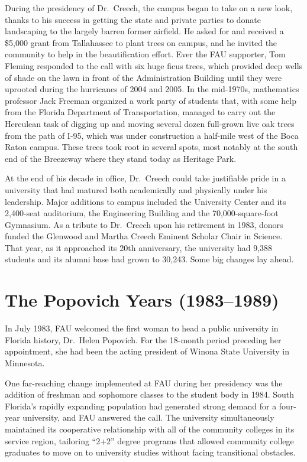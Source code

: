 \documentclass{article}
\begin{document}
During the presidency of Dr.\ Creech, the campus began to take on a new look, thanks to his success in getting the state and private parties to donate landscaping to the largely barren former airfield.  He asked for and received a \$5,000 grant from Tallahassee to plant trees on campus, and he invited the community to help in the beautification effort.  Ever the FAU supporter, Tom Fleming responded to the call with six huge ficus trees, which provided deep wells of shade on the lawn in front of the Administration Building until they were uprooted during the hurricanes of 2004 and 2005.  In the mid-1970s, mathematics professor Jack Freeman organized a work party of students that, with some help from the Florida Department of Transportation, managed to carry out the Herculean task of digging up and moving several dozen full-grown live oak trees from the path of I-95, which was under construction a half-mile west of the Boca Raton campus.  These trees took root in several spots, most notably at the south end of the Breezeway where they stand today as Heritage Park.

At the end of his decade in office, Dr.\ Creech could take justifiable pride in a university that had matured both academically and physically under his leadership.  Major additions to campus included the University Center and its 2,400-seat auditorium, the Engineering Building and the 70,000-square-foot Gymnasium.  As a tribute to Dr.\ Creech upon his retirement in 1983, donors funded the Glenwood and Martha Creech Eminent Scholar Chair in Science.  That year, as it approached its 20th anniversary, the university had 9,388 students and its alumni base had grown to 30,243.  Some big changes lay ahead.

\section{The Popovich Years (1983--1989)}

In July 1983, FAU welcomed the first woman to head a public university in Florida history, Dr.\ Helen Popovich. For the 18-month period preceding her appointment, she had been the acting president of Winona State University in Minnesota.

One far-reaching change implemented at FAU during her presidency was the addition of freshman and sophomore classes to the student body in 1984.  South Florida's rapidly expanding population had generated strong demand for a four-year university, and FAU answered the call.  The university simultaneously maintained its cooperative relationship with all of the community colleges in its service region, tailoring ``2+2'' degree programs that allowed community college graduates to move on to university studies without facing transitional obstacles.
\end{document}
